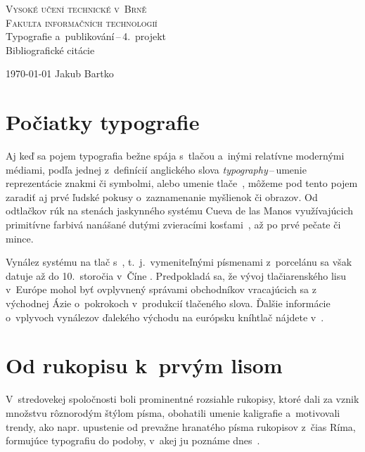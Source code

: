 \documentclass[a4paper, 11pt]{article}
\begin{document}
\begin{titlepage}
    \begin{center}
        \Huge
        \textsc{Vysoké učení technické v~Brně} \\
        \huge
        \textsc{Fakulta informačních technologií} \\
        \LARGE
        Typografie a~publikování\,--\,4.~projekt \\
        \Huge
        Bibliografické citácie\\
    \end{center}
    {\Large
        \today\hfill
        Jakub Bartko
    }
\end{titlepage}

\section{Počiatky typografie}
    Aj keď sa pojem typografia bežne spája s~tlačou a~inými relatívne modernými médiami, podľa jednej z~definícií anglického slova \textit{typography}\,--\,umenie reprezentácie znakmi či symbolmi, alebo umenie tlače~\cite{typography}, môžeme pod tento pojem zaradiť aj prvé ľudské pokusy o~zaznamenanie myšlienok či obrazov. Od odtlačkov rúk na stenách jaskynného systému Cueva de las Manos využívajúcich primitívne farbivá nanášané dutými zvieracími kosťami~\cite{cavepaintings}, až po prvé pečate či mince.

    Vynález systému na tlač s~, t.~j.~vymeniteľnými písmenami z~porcelánu sa však datuje až do 10.~storočia v~Číne \cite{chinaMoveable}. Predpokladá sa, že vývoj tlačiarenského lisu v~Európe mohol byť ovplyvnený správami obchodníkov vracajúcich sa z východnej Ázie o~pokrokoch v~produkcií tlačeného slova. Ďalšie informácie o~vplyvoch vynálezov ďalekého východu na európsku kníhtlač nájdete v~\cite{chinaAndEurope}. 
    
\section{Od rukopisu k~prvým lisom}
    V~stredovekej spoločnosti boli prominentné rozsiahle rukopisy, ktoré dali za vznik množstvu rôznorodým štýlom písma, obohatili umenie kaligrafie a~motivovali trendy, ako napr. upustenie od prevažne hranatého písma rukopisov z~čias Ríma, formujúce typografiu do podoby, v~akej ju poznáme dnes~\cite{printmag}.
    
\end{document}
